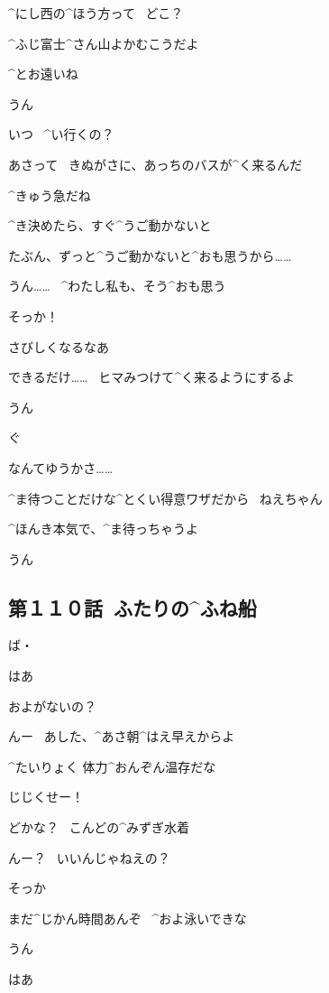 \page[143]
\Alpha ^{にし}{西}の^{ほう}{方}って
\ どこ？

\Takahiro ^{ふじ}{富士}^{さん}{山}よかむこうだよ

\Alpha ^{とお}{遠}いね

\Takahiro うん

\page[144]
\Alpha いつ
\ ^{い}{行}くの？

\Takahiro あさって
\ きぬがさに、あっちのバスが^{く}{来}るんだ

\Alpha ^{きゅう}{急}だね

\Takahiro ^{き}{決}めたら、すぐ^{うご}{動}かないと

\Takahiro たぶん、ずっと^{うご}{動}かないと^{おも}{思}うから……

\Alpha うん……
\ ^{わたし}{私}も、そう^{おも}{思}う

\Alpha そっか！

\page[145]
\Alpha さびしくなるなあ

\Takahiro できるだけ……
\ ヒマみつけて^{く}{来}るようにするよ

\Alpha うん

\page[146]
\Takahiro ぐ

\Alpha なんてゆうかさ……

\Alpha ^{ま}{待}つことだけな^{とくい}{得意}ワザだから
\ ねえちゃん

\Alpha ^{ほんき}{本気}で、^{ま}{待}っちゃうよ

\page[147]
\Takahiro うん


\subsection{第１１０話\ ふたりの^{ふね}{船}}

\page[153]
\Makki ば・

\Makki はあ

\Makki およがないの？

\Takahiro んー
\ あした、^{あさ}{朝}^{はえ}{早}えからよ

\Takahiro ^{たいりょく }{体力}^{おんぞん}{温存}だな

\Makki じじくせー！

\page[154]
\Makki どかな？
\ こんどの^{みずぎ}{水着}

\Takahiro んー？
\ いいんじゃねえの？

\Makki そっか

\Takahiro まだ^{じかん}{時間}あんぞ
\ ^{およ}{泳}いできな

\Makki うん

\page[155]
\Makki はあ

